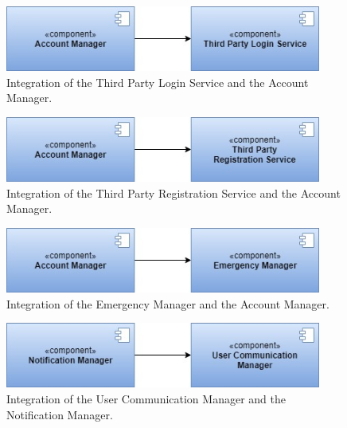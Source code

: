 \begin{figure}[H]
    \centering
    \includegraphics[width=295pt]{images/IntegrationSequence/TrackMe-Integration_sequence16.jpg}
    \caption{Integration of the Third Party Login Service and the Account Manager.}
\end{figure}
\begin{figure}[H]
    \centering
    \includegraphics[width=295pt]{images/IntegrationSequence/TrackMe-Integration_sequence17.jpg}
    \caption{Integration of the Third Party Registration Service and the Account Manager.}
\end{figure}
\begin{figure}[H]
    \centering
    \includegraphics[width=295pt]{images/IntegrationSequence/TrackMe-Integration_sequence19.jpg}
    \caption{Integration of the Emergency Manager and the Account Manager.}
\end{figure}
\begin{figure}[H]
    \centering
    \includegraphics[width=295pt]{images/IntegrationSequence/TrackMe-Integration_sequence21.jpg}
    \caption{Integration of the User Communication Manager and the Notification Manager.}
\end{figure}
\clearpage
